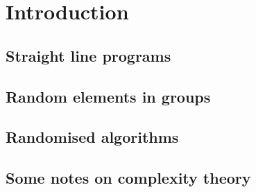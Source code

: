 
\chapter{Introduction}

\section{Straight line programs}
\label{slp}

\section{Random elements in groups}
\label{randomelts}

\section{Randomised algorithms}
\label{montevegas}

\section{Some notes on complexity theory}
\label{sec:complexity}

